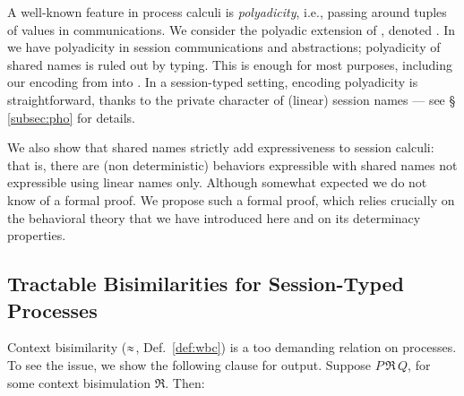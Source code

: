 A well-known feature in process calculi is \emph{polyadicity}, i.e.,  
passing around tuples of values in communications. 
We consider the polyadic extension of \HOp, denoted \pHOp.
In \pHOp we have polyadicity in session communications and abstractions; 
polyadicity of shared names is ruled out by typing. 
This is enough for most purposes, including our encoding from \HOp into \HO.
In a session-typed setting, encoding polyadicity is straightforward, thanks to 
the private character of 
(linear) session names --- see \S\,\ref{subsec:pho} for details.

\smallskip

We also show that shared names strictly add expressiveness to session calculi: that is,
there are (non deterministic) behaviors expressible with shared names not expressible using linear names only.
Although somewhat expected we do not know of a formal proof.
We propose such a formal proof, which relies crucially on the behavioral theory that we have introduced here
and on its determinacy properties. %


\subsection{Tractable Bisimilarities for Session-Typed Processes}
\label{subsec:intro:bisimulation}
\noi 
{}
Context bisimilarity ($\approx$, Def.~\ref{def:wbc}) is a too demanding relation on processes. 
To see the issue, we show 
the following clause for output.
Suppose $P \,\Re\, Q$, for some context bisimulation $\Re$. Then:

